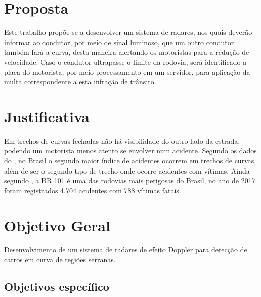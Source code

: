 \section{Proposta}

Este trabalho propõe-se a desenvolver um sistema de radares, nos quais deverão informar ao condutor, por meio de sinal luminoso, que um outro condutor também fará a curva, desta maneira alertando os motoristas para a redução de velocidade. Caso o condutor ultrapasse o limite da rodovia, será identificado a placa do motorista, por meio processamento em um servidor, para aplicação da multa correspondente a esta infração de trânsito.



\section{Justificativa}

Em trechos de curvas fechadas não há visibilidade do outro lado da estrada, podendo um motorista menos atento se envolver num acidente. Segundo os dados do \cite{anuario_rodoviario}, no Brasil o segundo maior índice de acidentes ocorrem em trechos de curvas, além de ser o segundo tipo de trecho onde ocorre acidentes com vítimas. Ainda segundo \cite{anuario_rodoviario}, a BR 101 é uma das rodovias mais perigosas do Brasil, no ano de 2017 foram registrados 4.704 acidentes com 788 vítimas fatais. 

\section{Objetivo Geral}

Desenvolvimento de um sistema de radares de efeito Doppler para detecção de carros em curva de regiões serranas.


\subsection{Objetivos específico}

